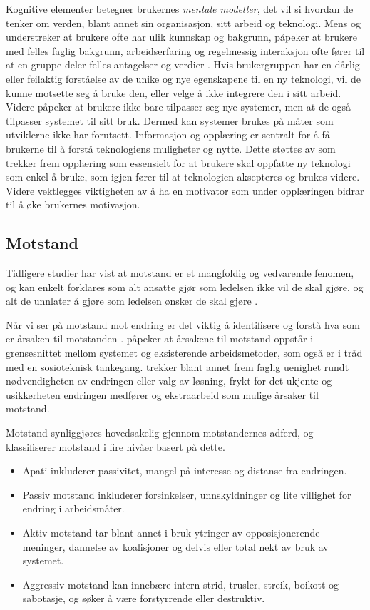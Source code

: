 \noindent
Kognitive elementer betegner brukernes \textit{mentale modeller}, det vil si hvordan de tenker om verden, blant annet sin organisasjon, sitt arbeid og teknologi. Mens \citet{Berg99} og \citet{Ackermann00} understreker at brukere ofte har ulik kunnskap og bakgrunn, påpeker \citep{Orlikowski92} at brukere med felles faglig bakgrunn, arbeidserfaring og regelmessig interaksjon ofte fører til at en gruppe deler felles antagelser og verdier . Hvis brukergruppen har en dårlig eller feilaktig forståelse av de unike og nye egenskapene til en ny teknologi, vil de kunne motsette seg å bruke den, eller velge å ikke integrere den i sitt arbeid. Videre påpeker \citet{Ackermann00} at brukere ikke bare tilpasser seg nye systemer, men at de også tilpasser systemet til sitt bruk. Dermed kan systemer brukes på måter som utviklerne  ikke har forutsett. Informasjon og opplæring er sentralt for å få brukerne til å forstå teknologiens muligheter og nytte. Dette støttes av \citet{Venkatesh99} som trekker frem opplæring som essensielt for at brukere skal oppfatte ny teknologi som enkel å bruke, som igjen fører til at teknologien aksepteres og brukes videre. Videre vektlegges viktigheten av å ha en motivator som under opplæringen bidrar til å øke brukernes motivasjon.
 
\subsection{Motstand}
\label{sec:motstand}
Tidligere studier har vist at motstand er et mangfoldig og vedvarende fenomen, og kan enkelt forklares som alt ansatte gjør som ledelsen ikke vil de skal gjøre, og alt de unnlater å gjøre som ledelsen ønsker de skal gjøre \citep{Timmons03}.
 
\noindent
Når vi ser på motstand mot endring er det viktig å identifisere og forstå hva som er årsaken til motstanden \citep{Lapointe05}. \citet{Timmons03} påpeker at årsakene til motstand oppstår i grensesnittet mellom systemet og eksisterende arbeidsmetoder, som også er i tråd med en sosioteknisk tankegang. \citet{Jacobsen12} trekker blant annet frem faglig uenighet rundt nødvendigheten av endringen eller valg av løsning, frykt for det ukjente og usikkerheten endringen medfører og ekstraarbeid som mulige årsaker til motstand.
 
\noindent
Motstand synliggjøres hovedsakelig gjennom motstandernes adferd, og \citet{Lapointe05} klassifiserer motstand i fire nivåer basert på dette.
 
\begin{itemize}
\item Apati inkluderer passivitet, mangel på interesse og distanse fra endringen.
\item Passiv motstand inkluderer forsinkelser, unnskyldninger og lite villighet for endring i arbeidsmåter.
\item Aktiv motstand tar blant annet i bruk ytringer av opposisjonerende meninger, dannelse av koalisjoner og delvis eller total nekt av bruk av systemet.
\item Aggressiv motstand kan innebære intern strid, trusler, streik, boikott og sabotasje, og søker å være forstyrrende eller destruktiv.
\end{itemize}
 

